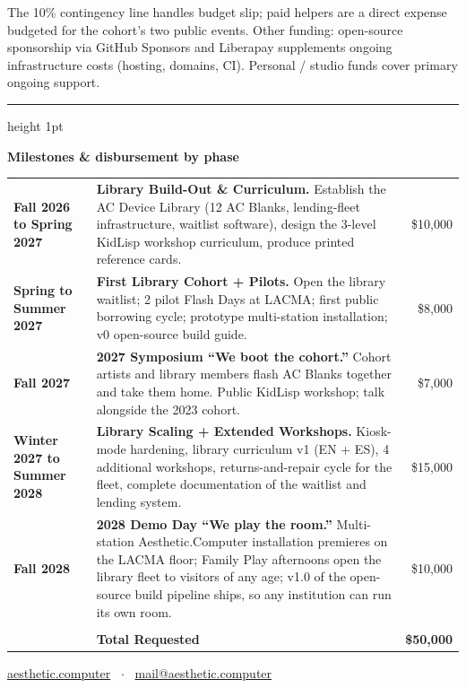 \documentclass[12pt,letterpaper]{article}
\begin{document}
\vspace{1.6em}

{\color{acgray}\small The 10\% contingency line handles budget slip; paid helpers are a direct expense budgeted for the cohort's two public events. Other funding: open-source sponsorship via GitHub Sponsors and Liberapay supplements ongoing infrastructure costs (hosting, domains, CI). Personal / studio funds cover primary ongoing support.}

\vspace{2em}

{\color{acpink}\hrule height 1pt}
\vspace{1em}

{\bfseries Milestones \& disbursement by phase}

\renewcommand{\arraystretch}{1.3}
\begin{tabularx}{\textwidth}{@{}lXr@{}}
  \textbf{Fall 2026 to Spring 2027} & \textbf{Library Build-Out \& Curriculum.} Establish the AC Device Library (12 AC Blanks, lending-fleet infrastructure, waitlist software), design the 3-level KidLisp workshop curriculum, produce printed reference cards. & \$10,000 \\
  \textbf{Spring to Summer 2027} & \textbf{First Library Cohort + Pilots.} Open the library waitlist; 2 pilot Flash Days at LACMA; first public borrowing cycle; prototype multi-station installation; v0 open-source build guide. & \$8,000 \\
  \textbf{Fall 2027} & \textbf{2027 Symposium ``We boot the cohort.''} Cohort artists and library members flash AC Blanks together and take them home. Public KidLisp workshop; talk alongside the 2023 cohort. & \$7,000 \\
  \textbf{Winter 2027 to Summer 2028} & \textbf{Library Scaling + Extended Workshops.} Kiosk-mode hardening, library curriculum v1 (EN + ES), 4 additional workshops, returns-and-repair cycle for the fleet, complete documentation of the waitlist and lending system. & \$15,000 \\
  \textbf{Fall 2028} & \textbf{2028 Demo Day ``We play the room.''} Multi-station Aesthetic.Computer installation premieres on the LACMA floor; Family Play afternoons open the library fleet to visitors of any age; v1.0 of the open-source build pipeline ships, so any institution can run its own room. & \$10,000 \\
  {\color{acgray}\hrulefill} & {\color{acgray}\hrulefill} & {\color{acgray}\hrulefill} \\[-0.3em]
  & \textbf{Total Requested} & \textbf{\$50,000} \\
\end{tabularx}
\renewcommand{\arraystretch}{1.0}

\vfill
\begin{center}
  {\color{acgray}\small \href{https://aesthetic.computer}{aesthetic.computer} \ $\cdot$ \ \href{mailto:mail@aesthetic.computer}{mail@aesthetic.computer}}
\end{center}
\end{document}
